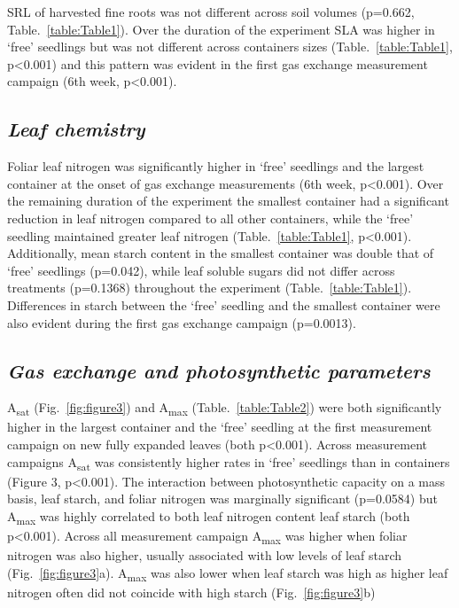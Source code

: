 \documentclass[a4paper]{article}\usepackage[]{graphicx}\usepackage[]{color}
\begin{document}
SRL of harvested fine roots was not different across soil volumes (p=0.662, Table.~\ref{table:Table1}). Over the duration of the experiment SLA was higher in ‘free’ seedlings but was not different across containers sizes (Table.~\ref{table:Table1}, p\textless0.001) and this pattern was evident in the first gas exchange measurement campaign (6th week, p\textless0.001).

\subsection*{\textit{Leaf chemistry}}
Foliar leaf nitrogen was significantly higher in ‘free’ seedlings and the largest container at the onset of gas exchange measurements (6th week, p\textless0.001).  Over the remaining duration of the experiment the smallest container had a significant reduction in leaf nitrogen compared to all other containers, while the ‘free’ seedling maintained greater leaf nitrogen (Table.~\ref{table:Table1}, p\textless0.001).  Additionally, mean starch content in the smallest container was double that of ‘free’ seedlings (p=0.042), while leaf soluble sugars did not differ across treatments (p=0.1368) throughout the experiment (Table.~\ref{table:Table1}).  Differences in starch between the ‘free’ seedling and the smallest container were also evident during the first gas exchange campaign (p=0.0013).

\subsection*{\textit{Gas exchange and photosynthetic parameters}}
A\textsubscript{sat} (Fig.~\ref{fig:figure3}) and A\textsubscript{max} (Table.~\ref{table:Table2}) were both significantly higher in the largest container and the ‘free’ seedling at the first measurement campaign on new fully expanded leaves (both p\textless0.001). Across measurement campaigns A\textsubscript{sat} was consistently higher rates in ‘free’ seedlings than in containers (Figure 3, p\textless0.001). The interaction between photosynthetic capacity on a mass basis, leaf starch, and foliar nitrogen was marginally significant (p=0.0584) but A\textsubscript{max} was highly correlated to both leaf nitrogen content leaf starch (both p\textless0.001). Across all measurement campaign A\textsubscript{max} was higher when foliar nitrogen was also higher, usually associated with low levels of leaf starch (Fig.~\ref{fig:figure3}a). A\textsubscript{max} was also lower when leaf starch was high as higher leaf nitrogen often did not coincide with high starch (Fig.~\ref{fig:figure3}b)
\end{document}
